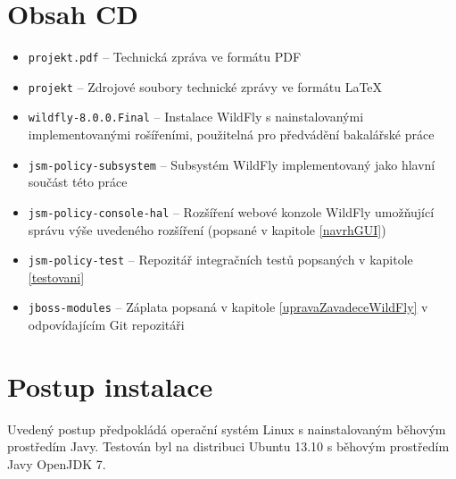 \chapter{Obsah CD}

\begin{itemize}
  \item {\tt projekt.pdf} -- Technická zpráva ve formátu PDF
  \item {\tt projekt} -- Zdrojové soubory technické zprávy ve formátu \LaTeX

  \item {\tt wildfly-8.0.0.Final} -- Instalace WildFly s nainstalovanými implementovanými rošířeními, použitelná pro předvádění bakalářské práce

  \item {\tt jsm-policy-subsystem} -- Subsystém WildFly implementovaný jako hlavní součást této práce
  \item {\tt jsm-policy-console-hal} -- Rozšíření webové konzole WildFly umožňující správu výše uvedeného rozšíření (popsané v kapitole \ref{navrhGUI})
  \item {\tt jsm-policy-test} -- Repozitář integračních testů popsaných v kapitole \ref{testovani}

  \item {\tt jboss-modules} -- Záplata popsaná v kapitole \ref{upravaZavadeceWildFly} v odpovídajícím Git repozitáři
\end{itemize}


\chapter{Postup instalace}

Uvedený postup předpokládá operační systém Linux s nainstalovaným běhovým prostředím Javy. Testován byl na distribuci Ubuntu 13.10 s běhovým prostředím Javy OpenJDK 7.

